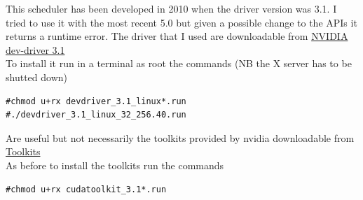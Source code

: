 \documentclass[a4paper,13pt]{article}
\begin{document}
\begin{multicols}{2}
    This scheduler has been developed in 2010 when the driver version was 3.1. I tried to use it with the most recent 5.0 but given a possible change to the APIs it returns a runtime error.
    The driver that I used are downloadable from \href{https://mega.co.nz/#!g49wnBaR!eVaf8DeGmDyPUV8VoJMtHRAHXDE4_-EWxwrmL6LCHWY}{NVIDIA dev-driver 3.1}\\
    To install it run in a terminal as root the commands (NB the X server has to be shutted down)
  \lstset{language=bash}
\begin{lstlisting}
#chmod u+rx devdriver_3.1_linux*.run
#./devdriver_3.1_linux_32_256.40.run
\end{lstlisting}
    Are useful but not necessarily the toolkits provided by nvidia downloadable from \href{https://mega.co.nz/#!88kFCCJL!FmqUdQHY0VE00V5aQOcTQRuaufw9bZ6AS7ZyfQGXiSc} {Toolkits}\\
    As before to install the toolkits run the commands
\begin{lstlisting}
#chmod u+rx cudatoolkit_3.1*.run
\end{lstlisting}
    


\begin{verbatimtab}
\end{verbatimtab}




%
%

\end{multicols}
\end{document}
